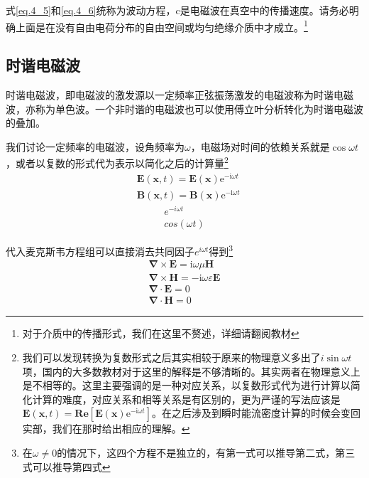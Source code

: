         式\ref{eq.4_5}和\ref{eq.4_6}统称为波动方程，c是电磁波在真空中的传播速度。请务必明确上面是在没有自由电荷分布的自由空间或均匀绝缘介质中才成立。\footnote{对于介质中的传播形式，我们在这里不赘述，详细请翻阅教材}
    \subsection{时谐电磁波}
        时谐电磁波，即电磁波的激发源以一定频率正弦振荡激发的电磁波称为时谐电磁波，亦称为单色波。一个非时谐的电磁波也可以使用傅立叶分析转化为时谐电磁波的叠加。

        我们讨论一定频率的电磁波，设角频率为$\omega$，电磁场对时间的依赖关系就是$\cos \omega t$，或者以复数的形式代为表示以简化之后的计算量\footnote{我们可以发现转换为复数形式之后其实相较于原来的物理意义多出了$i \sin \omega t$项，国内的大多数教材对于这里的解释是不够清晰的。其实两者在物理意义上是不相等的。这里主要强调的是一种对应关系，以复数形式代为进行计算以简化计算的难度，对应关系和相等关系是有区别的，更为严谨的写法应该是$\boldsymbol{E}(\boldsymbol{x}, t)=\boldsymbol{Re}[\boldsymbol{E}(\boldsymbol{x}) \mathrm{e}^{-\mathrm{i} \omega t}]$。在之后涉及到瞬时能流密度计算的时候会变回实部，我们在那时给出相应的理解。   }
        \begin{equation}
            \begin{aligned}
            &\boldsymbol{E}(\boldsymbol{x}, t)=\boldsymbol{E}(\boldsymbol{x}) \mathrm{e}^{-\mathrm{i} \omega t} \\
            &\boldsymbol{B}(\boldsymbol{x}, t)=\boldsymbol{B}(\boldsymbol{x}) \mathrm{e}^{-\mathrm{i} \omega t}
            \end{aligned}
        \end{equation}
        \begin{equation}
            \begin{gathered}
                e^{-i \omega t}  \\
                cos(\omega t)
            \end{gathered}
        \end{equation}

        代入麦克斯韦方程组可以直接消去共同因子$e^{i \omega t}$得到\footnote{在$\omega \neq 0$的情况下，这四个方程不是独立的，有第一式可以推导第二式，第三式可以推导第四式}
        \begin{equation}
            \begin{gathered}
            \boldsymbol{\nabla} \times \boldsymbol{E}=\mathrm{i} \omega \mu \boldsymbol{H} \\
            \boldsymbol{\nabla} \times \boldsymbol{H}=-\mathrm{i} \omega \varepsilon \boldsymbol{E} \\
            \boldsymbol{\nabla} \cdot \boldsymbol{E}=0 \\
            \boldsymbol{\nabla} \cdot \mathbf{H}=0
            \end{gathered}
            \end{equation}
        
